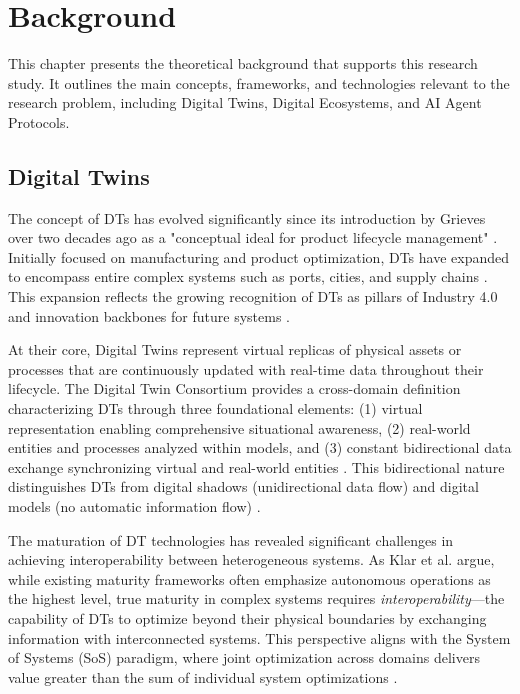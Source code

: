 \chapter{Background}
\label{chap:background}

This chapter presents the theoretical background that supports this research study.
It outlines the main concepts, frameworks, and technologies relevant to the research problem,
    including Digital Twins, Digital Ecosystems, and AI Agent Protocols.

\section{Digital Twins}

The concept of DTs has evolved significantly since its introduction by Grieves over two decades ago as a "conceptual ideal for product lifecycle management" \cite{Grieves_2017}.
Initially focused on manufacturing and product optimization, DTs have expanded to encompass entire complex systems such as 
    ports, cities, and supply chains \cite{Klar_2024}.
This expansion reflects the growing recognition of DTs as pillars of Industry 4.0 and innovation backbones for future systems \cite{Jiang_2021}.

At their core, Digital Twins represent virtual replicas of physical assets or processes that are continuously updated with real-time data throughout their lifecycle.
The Digital Twin Consortium provides a cross-domain definition characterizing DTs through three foundational elements:
    (1) virtual representation enabling comprehensive situational awareness,
    (2) real-world entities and processes analyzed within models, and
    (3) constant bidirectional data exchange synchronizing virtual and real-world entities \cite{Budiardjo_2021}.
This bidirectional nature distinguishes DTs from 
    digital shadows (unidirectional data flow) and 
    digital models (no automatic information flow) \cite{Botín-Sanabria_2022}.

The maturation of DT technologies has revealed significant challenges in achieving interoperability between heterogeneous systems.
As Klar et al. \cite{Klar_2024} argue, while existing maturity frameworks often emphasize autonomous operations as the highest level,
    true maturity in complex systems requires 
    \emph{interoperability}—the capability of DTs to optimize beyond their physical boundaries by exchanging information with interconnected systems.
This perspective aligns with the System of Systems (SoS) paradigm, where 
    joint optimization across domains delivers value greater than the sum of individual system optimizations \cite{Dietz_2020}.

